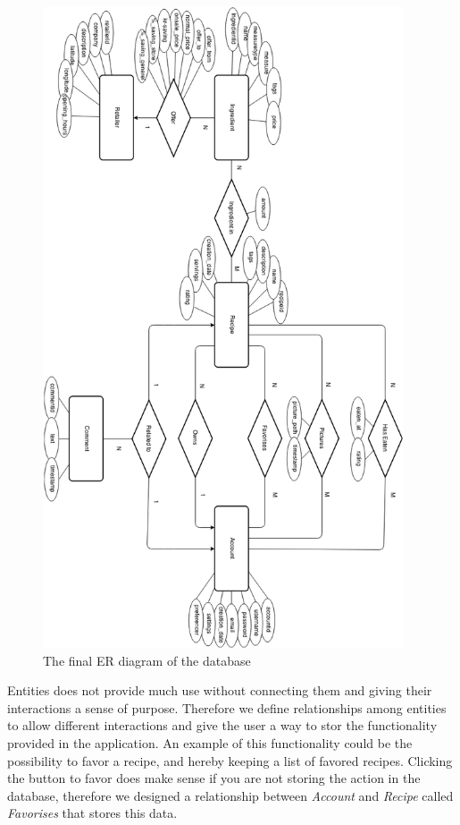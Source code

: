 \begin{figure}
\centering
\includegraphics[width=0.95\textwidth]{Pictures/ERdiagram}
\caption{The final ER diagram of the database}
\label{fig:ER-diagram}
\end{figure}

Entities does not provide much use without connecting them and giving their interactions a sense of purpose. Therefore we define relationships among entities to allow different interactions and give the user a way to stor the functionality provided in the application. An example of this functionality could be the possibility to favor a recipe, and hereby keeping a list of favored recipes. Clicking the button to favor does make sense if you are not storing the action in the database, therefore we designed a relationship between \textit{Account} and \textit{Recipe} called \textit{Favorises} that stores this data.

